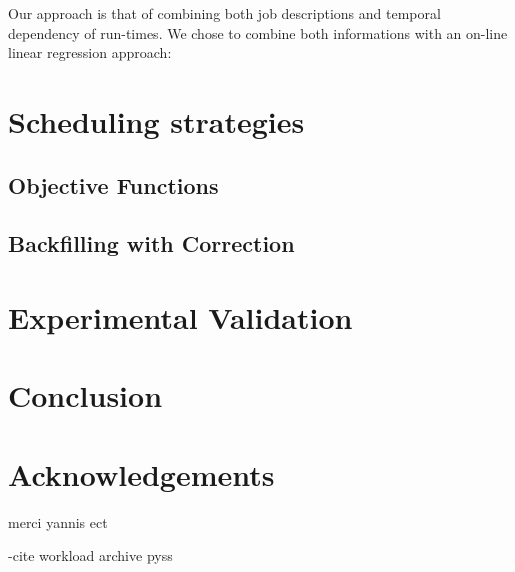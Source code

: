 Our approach is that of combining both job descriptions and temporal dependency of run-times. We chose to combine both informations with an on-line linear regression approach:


\section{Scheduling strategies}
\label{sec:scheduling_strategies}

\subsection{Objective Functions}
\label{sub:objective_functions}

\subsection{Backfilling with Correction}
\label{sub:backfilling_with_correction}


\section{Experimental Validation}
\label{sec:experimental_validation}

\section{Conclusion}
\label{sec:conclusion}

\section{Acknowledgements}
\label{sec:ack}
merci yannis ect

-cite
workload archive
pyss


